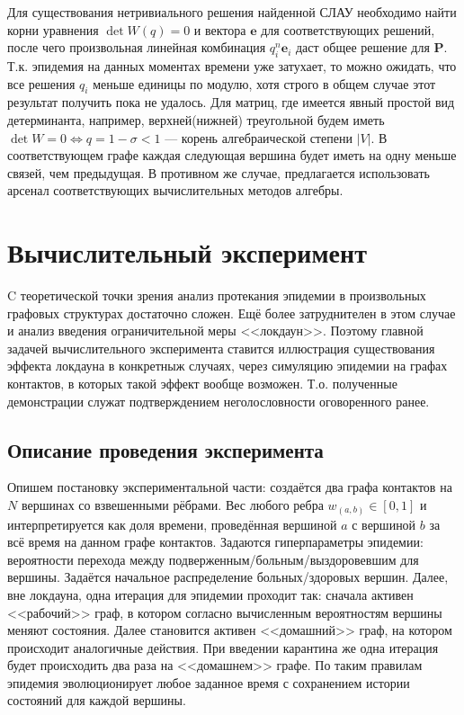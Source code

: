 	 Для существования нетривиального решения найденной СЛАУ необходимо найти корни уравнения $\det W(q) = 0$ и вектора $\mathbf{e}$ для соответствующих решений, после чего произвольная линейная комбинация $q_i^n \mathbf{e}_i$ даст общее решение для $\mathbf{P}$. Т.к. эпидемия на данных моментах времени уже затухает, то можно ожидать, что все решения $q_i$ меньше единицы по модулю, хотя строго в общем случае этот результат получить пока не удалось. Для матриц, где имеется явный простой вид детерминанта, например, верхней(нижней) треугольной будем иметь $\det W = 0 \Leftrightarrow q = 1 - \sigma < 1$ --- корень алгебраической степени $|V|$. В соответствующем графе каждая следующая вершина будет иметь на одну меньше связей, чем предыдущая. В противном же случае, предлагается использовать арсенал соответствующих вычислительных методов алгебры.
	
	\section*{Вычислительный эксперимент}
	
	C теоретической точки зрения анализ протекания эпидемии в произвольных графовых структурах достаточно сложен. Ещё более затруднителен в этом случае и анализ введения ограничительной меры <<локдаун>>. Поэтому главной задачей вычислительного эксперимента ставится иллюстрация существования эффекта локдауна в конкретныж случаях, через симуляцию эпидемии на графах контактов, в которых такой эффект вообще возможен. Т.о. полученные демонстрации служат подтверждением неголословности оговоренного ранее.
	
	\subsection*{Описание проведения эксперимента}
	
	Опишем постановку экспериментальной части: создаётся два графа контактов на $ N $ вершинах со взвешенными рёбрами. Вес любого ребра $ w_{(a, b)} \in [0, 1] $ и интерпретируется как доля времени, проведённая вершиной $ a $ с вершиной $ b $ за всё время на данном графе контактов. Задаются гиперпараметры эпидемии: вероятности перехода между подверженным/больным/выздоровевшим для вершины. Задаётся начальное распределение больных/здоровых вершин. Далее, вне локдауна, одна итерация для эпидемии проходит так: сначала активен <<рабочий>> граф, в котором согласно вычисленным вероятностям вершины меняют состояния. Далее становится активен <<домашний>> граф, на котором происходит аналогичные действия. При введении карантина же одна итерация будет происходить два раза на <<домашнем>> графе. По таким правилам эпидемия эволюционирует любое заданное время с сохранением истории состояний для каждой вершины.
	
